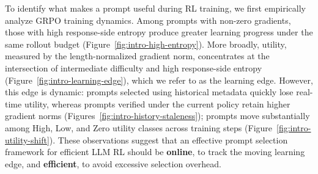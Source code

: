 To identify what makes a prompt useful during RL training, we first empirically analyze GRPO training dynamics. Among prompts with non-zero gradients, those with high response-side entropy produce greater learning progress under the same rollout budget (Figure~\ref{fig:intro-high-entropy}). More broadly, utility, measured by the length-normalized gradient norm, concentrates at the intersection of intermediate difficulty and high response-side entropy (Figure~\ref{fig:intro-learning-edge}), which we refer to as the learning edge. However, this edge is dynamic: prompts selected using historical metadata quickly lose real-time utility, whereas prompts verified under the current policy retain higher gradient norms (Figures~\ref{fig:intro-history-staleness}); prompts move substantially among High, Low, and Zero utility classes across training steps (Figure~\ref{fig:intro-utility-shift}). These observations suggest that an effective prompt selection framework for efficient LLM RL should be \textbf{online}, to track the moving learning edge, and \textbf{efficient}, to avoid excessive selection overhead.
